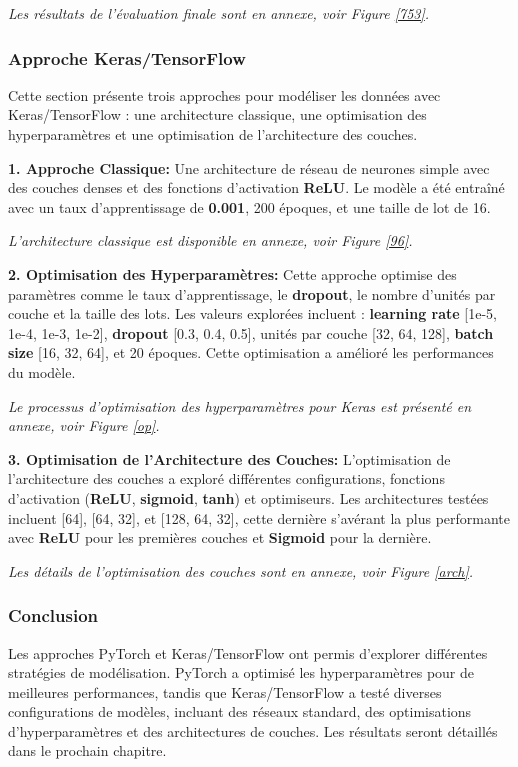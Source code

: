 \textit{Les résultats de l'évaluation finale sont en annexe, voir Figure \ref{753}.}

\subsubsection{Approche Keras/TensorFlow}

Cette section présente trois approches pour modéliser les données avec Keras/TensorFlow : une architecture classique, une optimisation des hyperparamètres et une optimisation de l'architecture des couches.

\textbf{1. Approche Classique:} Une architecture de réseau de neurones simple avec des couches denses et des fonctions d'activation \textbf{ReLU}. Le modèle a été entraîné avec un taux d'apprentissage de \textbf{0.001}, 200 époques, et une taille de lot de 16.

\textit{L'architecture classique est disponible en annexe, voir Figure \ref{96}.}

\textbf{2. Optimisation des Hyperparamètres:} Cette approche optimise des paramètres comme le taux d'apprentissage, le \textbf{dropout}, le nombre d'unités par couche et la taille des lots. Les valeurs explorées incluent :
\textbf{learning rate} [1e-5, 1e-4, 1e-3, 1e-2], \textbf{dropout} [0.3, 0.4, 0.5], unités par couche [32, 64, 128], \textbf{batch size} [16, 32, 64], et 20 époques. Cette optimisation a amélioré les performances du modèle.

\textit{Le processus d'optimisation des hyperparamètres pour Keras est présenté en annexe, voir Figure \ref{op}.}

\textbf{3. Optimisation de l'Architecture des Couches:} L'optimisation de l'architecture des couches a exploré différentes configurations, fonctions d'activation (\textbf{ReLU}, \textbf{sigmoid}, \textbf{tanh}) et optimiseurs. Les architectures testées incluent [64], [64, 32], et [128, 64, 32], cette dernière s'avérant la plus performante avec \textbf{ReLU} pour les premières couches et \textbf{Sigmoid} pour la dernière.

\textit{Les détails de l'optimisation des couches sont en annexe, voir Figure \ref{arch}.}


\subsubsection{Conclusion}
Les approches PyTorch et Keras/TensorFlow ont permis d'explorer différentes stratégies de modélisation. PyTorch a optimisé les hyperparamètres pour de meilleures performances, tandis que Keras/TensorFlow a testé diverses configurations de modèles, incluant des réseaux standard, des optimisations d'hyperparamètres et des architectures de couches. Les résultats seront détaillés dans le prochain chapitre.

